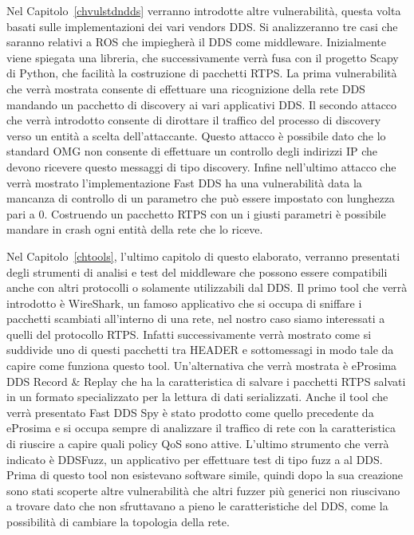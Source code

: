 Nel Capitolo~\ref{chvulstdndds} verranno introdotte altre vulnerabilità,
questa volta basati sulle implementazioni dei vari vendors DDS. 
Si analizzeranno tre casi che saranno relativi a ROS che impiegherà 
il DDS come middleware. Inizialmente viene spiegata una libreria, che
successivamente verrà fusa con il progetto Scapy di Python, che facilità
la costruzione di pacchetti RTPS. La prima vulnerabilità che verrà 
mostrata consente di effettuare una ricognizione della rete DDS 
mandando un pacchetto di discovery ai vari applicativi DDS.
Il secondo attacco che verrà introdotto consente di dirottare il traffico 
del processo di discovery verso un entità a scelta dell'attaccante.
Questo attacco è possibile dato che lo standard OMG non consente 
di effettuare un controllo degli indirizzi IP che devono ricevere 
questo messaggi di tipo discovery.
Infine nell'ultimo attacco che verrà mostrato l'implementazione 
Fast DDS ha una vulnerabilità data la mancanza di controllo di 
un parametro che può essere impostato con lunghezza pari a 0. 
Costruendo un pacchetto RTPS con un i giusti parametri è possibile 
mandare in crash ogni entità della rete che lo riceve.

Nel Capitolo~\ref{chtools}, l'ultimo capitolo di questo elaborato,
verranno presentati degli strumenti di analisi e test del middleware 
che possono essere compatibili anche con altri protocolli o solamente
utilizzabili dal DDS. Il primo tool che verrà introdotto è WireShark, 
un famoso applicativo che si occupa di sniffare i pacchetti scambiati 
all'interno di una rete, nel nostro caso siamo interessati a quelli 
del protocollo RTPS. Infatti successivamente verrà mostrato come 
si suddivide uno di questi pacchetti tra HEADER e sottomessagi in 
modo tale da capire come funziona questo tool. Un'alternativa 
che verrà mostrata è eProsima DDS Record \&
Replay che ha la caratteristica di salvare i pacchetti RTPS salvati 
in un formato specializzato per la lettura di dati serializzati.
Anche il tool che verrà presentato Fast DDS Spy è stato prodotto 
come quello precedente da eProsima e si occupa sempre di analizzare 
il traffico di rete con la caratteristica di riuscire a capire 
quali policy QoS sono attive.
L'ultimo strumento che verrà indicato è DDSFuzz, un applicativo 
per effettuare test di tipo fuzz a al DDS. Prima di questo tool non 
esistevano software simile, quindi dopo la sua creazione sono stati 
scoperte altre vulnerabilità che altri fuzzer più generici non riuscivano 
a trovare dato che non sfruttavano a pieno le caratteristiche del DDS, 
come la possibilità di cambiare la topologia della rete.